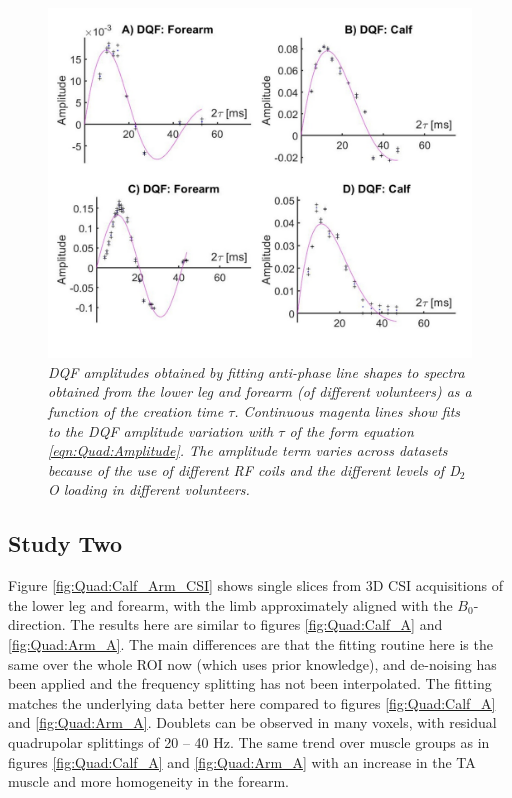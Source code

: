 \documentclass[class=article, crop=false]{standalone}
\begin{document}
\begin{figure}
    \centering
    \includegraphics[width=1\textwidth]{Figures/Quad/BuildUp.png}
    \caption{\textit{DQF amplitudes obtained by fitting anti-phase line shapes to spectra obtained from the lower leg and forearm (of different volunteers) as a function of the creation time $\tau$. Continuous magenta lines show fits to the DQF amplitude variation with $\tau$ of the form equation \ref{eqn:Quad:Amplitude}. The amplitude term varies across datasets because of the use of different RF coils and the different levels of D$_2$O loading in different volunteers.}}
    \label{fig:Quad:BuildUp}
\end{figure}

\subsection{Study Two}

Figure \ref{fig:Quad:Calf_Arm_CSI} shows single slices from 3D CSI acquisitions of the lower leg and forearm, with the limb approximately aligned with the $B_0$-direction. The results here are similar to figures \ref{fig:Quad:Calf_A} and \ref{fig:Quad:Arm_A}. The main differences are that the fitting routine here is the same over the whole ROI now (which uses prior knowledge), and de-noising has been applied and the frequency splitting has not been interpolated. The fitting matches the underlying data better here compared to figures \ref{fig:Quad:Calf_A} and \ref{fig:Quad:Arm_A}. Doublets can be observed in many voxels, with residual quadrupolar splittings of 20 – 40 Hz. The same trend over muscle groups as in figures \ref{fig:Quad:Calf_A} and \ref{fig:Quad:Arm_A} with an increase in the TA muscle and more homogeneity in the forearm.
\end{document}
